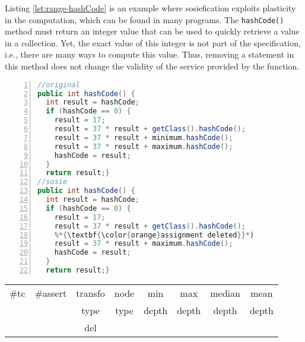 Listing \ref{lst:range-hashCode} is an example where sosiefication exploits plasticity in the computation, which can be found in many programs. 
The \texttt{hashCode()} method must return an integer value that can be used to quickly retrieve a value in a collection. Yet, the exact value of this integer is not part of the specification, i.e., there are many ways to compute this value. 
Thus, removing a statement in this method does not change the validity of the service provided by the function. 

\begin{minipage}{\columnwidth}
\begin{lstlisting}[caption={\texttt{hashCode} in commons.lang and a sosie},label={lst:range-hashCode},language=java,numbers=left]
//original
public int hashCode() {
  int result = hashCode;
  if (hashCode == 0) {
    result = 17;
    result = 37 * result + getClass().hashCode();
    result = 37 * result + minimum.hashCode(); 
    result = 37 * result + maximum.hashCode();
    hashCode = result;
  }
  return result;}
//sosie
public int hashCode() {
  int result = hashCode;
  if (hashCode == 0) {
    result = 17;
    result = 37 * result + getClass().hashCode();
    %*{\textbf{\color{orange}assignment deleted}}*)
    result = 37 * result + maximum.hashCode();
    hashCode = result;
  }
  return result;}
\end{lstlisting}
\tabcolsep=0.11cm
\begin{tabular}{>{\small}c>{\small}c>{\small}c>{\small}c>{\small}c>{\small}c>{\small}c>{\small}c}
\hline
\rowcolor{lightgray} \#tc & \#assert & transfo & node & min & max & median & mean   \\
\rowcolor{lightgray}  & & type & type & depth  & depth & depth & depth  \\ 
\hline
&  & del &  &  &  &  & \\
\hline
\end{tabular}
\end{minipage}